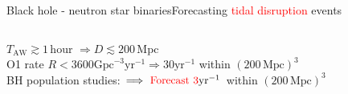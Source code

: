 \documentclass[xcolor=dvipsnames,handout,t]{beamer}
\newcommand{\red}[1]{\textcolor{red}{#1}}
\begin{document}
\begin{frame}{Black hole - neutron star binaries}{Forecasting \red{tidal disruption} events}
\begin{footnotesize}
\begin{table}[h]
\begin{tabular}{lccccc}
  \hline\hline
  \end{tabular}
  \end{table}
  \end{footnotesize}
  $T_\text{AW} \gtrsim 1\,$hour $\Longrightarrow D \lesssim 200\,$Mpc \\
  O1 rate $R < 3600 \text{Gpc}^{-3}\text{yr}^{-1} \Longrightarrow 30\text{yr}^{-1}$ within $(200\,\text{Mpc})^3$ \\
  BH population studies: $\Longrightarrow \text{ \red{Forecast} } \red{3}\text{yr}^{-1}$ within $(200\,\text{Mpc})^3$
\end{frame}
\end{document}
